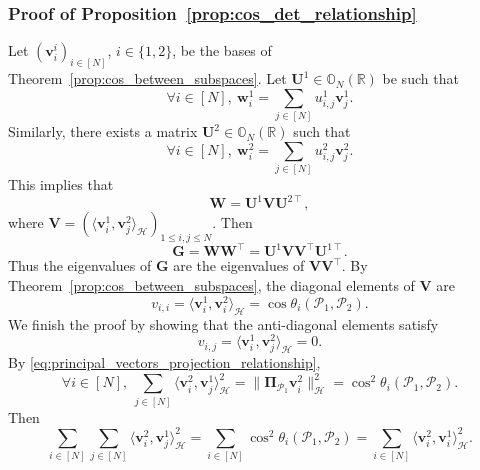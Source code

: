 \documentclass[twoside,11pt]{book}
\numberwithin{theorem}{chapter}
\numberwithin{definition}{chapter}
\numberwithin{proposition}{chapter}
\numberwithin{corollary}{chapter}
\numberwithin{example}{chapter}
\numberwithin{lemma}{chapter}
\numberwithin{assumption}{chapter}
\DeclareMathOperator{\Tran}{\intercal}
\begin{document}
\subsubsection{Proof of Proposition~\ref{prop:cos_det_relationship}}
Let $(\bm{v}^{i}_{i})_{i \in [N]}$, $i\in\{1,2\}$, be the bases of Theorem~\ref{prop:cos_between_subspaces}. Let $\bm{U}^{1} \in \mathbb{O}_{N}(\mathbb{R})$ be such that
\begin{equation}
\forall i \in [N], \: \bm{w}^{1}_{i} = \sum\limits_{j \in [N]} u^{1}_{i,j} \bm{v}^{1}_{j}.
\end{equation}
Similarly, there exists a matrix $\bm{U}^{2} \in \mathbb{O}_{N}(\mathbb{R})$ such that
\begin{equation}
\forall i \in [N], \: \bm{w}^{2}_{i} = \sum\limits_{j \in [N]} u^{2}_{i,j} \bm{v}^{2}_{j}.
\end{equation}
This implies that
\begin{equation}
\bm{W} = \bm{U}^{1}\bm{V}\bm{U}^{2 \Tran},
\end{equation}
where $\displaystyle \bm{V} = (\langle \bm{v}^{1}_{i}, \bm{v}^{2}_{j} \rangle_{\mathcal{H}})_{1 \leq i,j \leq N}$. Then
\begin{equation}
\bm{G} = \bm{W}\bm{W}^{\Tran} = \bm{U}^{1}\bm{V}\bm{V}^{\Tran}\bm{U}^{1 \Tran}.
\end{equation}
Thus the eigenvalues of $\bm{G}$ are the eigenvalues of $\bm{V}\bm{V}^{\Tran}$. By Theorem~\ref{prop:cos_between_subspaces}, the diagonal elements of $\bm{V}$ are
\begin{equation}\label{eq:diagonal_of_V}
v_{i,i} = \langle \bm{v}^{1}_{i}, \bm{v}^{2}_{i} \rangle_{\mathcal{H}} = \cos \theta_{i}(\mathcal{P}_{1},\mathcal{P}_{2}).
\end{equation}
We finish the proof by showing that the anti-diagonal elements satisfy
\begin{equation}\label{eq:anti_diagonal_of_V}
v_{i,j} = \langle \bm{v}^{1}_{i}, \bm{v}^{2}_{j} \rangle_{\mathcal{H}} = 0.
\end{equation}
By \eqref{eq:principal_vectors_projection_relationship},
\begin{equation}
\forall i \in [N], \:\sum\limits_{j \in [N]} \langle \bm{v}_{i}^{2}, \bm{v}_{j}^{1}\rangle_{\mathcal{H}}^{2} = \|\bm{\Pi}_{\mathcal{P}_{1}}\bm{v}_{i}^{2}\|_{\mathcal{H}}^{2} = \cos^{2} \theta_{i}(\mathcal{P}_{1},\mathcal{P}_{2}).
\end{equation}
Then
\begin{equation}
 \sum\limits_{i \in [N]}\sum\limits_{j \in [N]} \langle \bm{v}_{i}^{2}, \bm{v}_{j}^{1}\rangle_{\mathcal{H}}^{2} = \sum\limits_{i \in [N]} \cos^{2} \theta_{i}(\mathcal{P}_{1},\mathcal{P}_{2}) = \sum\limits_{i \in [N]} \langle \bm{v}_{i}^{2}, \bm{v}_{i}^{1}\rangle_{\mathcal{H}}^{2} .
\end{equation}
\end{document}
